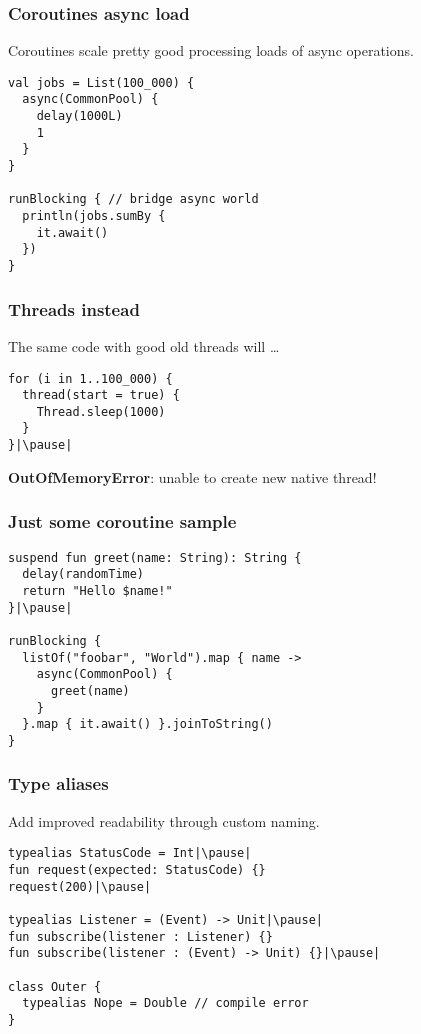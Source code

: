 \begin{frame}[fragile] \frametitle{Coroutines async load}
Coroutines scale pretty good processing loads of async operations.
\begin{lstlisting}
val jobs = List(100_000) {
  async(CommonPool) {
    delay(1000L)
    1
  }
}

runBlocking { // bridge async world
  println(jobs.sumBy {
    it.await()
  })
}
\end{lstlisting}
\end{frame}

\begin{frame}[fragile] \frametitle{Threads instead}
The same code with good old threads will \ldots
\begin{lstlisting}
for (i in 1..100_000) {
  thread(start = true) {
    Thread.sleep(1000)
  }
}|\pause|
\end{lstlisting}
\textbf{OutOfMemoryError}: unable to create new native thread!
\end{frame}



\begin{frame}[fragile] \frametitle{Just some coroutine sample}
\begin{lstlisting}
suspend fun greet(name: String): String {
  delay(randomTime)
  return "Hello $name!"
}|\pause|

runBlocking {
  listOf("foobar", "World").map { name ->
    async(CommonPool) {
      greet(name)
    }
  }.map { it.await() }.joinToString()
}
\end{lstlisting}
\end{frame}


\begin{frame}[fragile] \frametitle{Type aliases}
Add improved readability through custom naming.
\begin{lstlisting}
typealias StatusCode = Int|\pause|
fun request(expected: StatusCode) {}
request(200)|\pause|

typealias Listener = (Event) -> Unit|\pause|
fun subscribe(listener : Listener) {}
fun subscribe(listener : (Event) -> Unit) {}|\pause|

class Outer {
  typealias Nope = Double // compile error
}
\end{lstlisting}
\end{frame}

